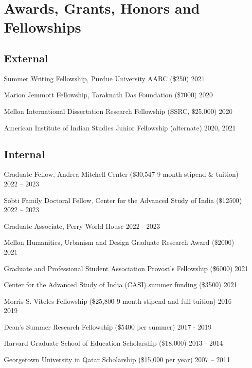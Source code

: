 \documentclass[11pt,letterpaper]{report}
\newcommand{\listitemspace}{0.25em}
\renewenvironment{itemize}{\begin{list}{}{\setlength{\leftmargin}{0em}\setlength{\parskip}{0em}\setlength{\itemsep}{\listitemspace}\setlength{\parsep}{\listitemspace}}}{\end{list}}
\begin{document}
    \section*{Awards, Grants, Honors and Fellowships}
    \subsection*{External}
    \begin{itemize}
        \item Summer Writing Fellowship, Purdue University AARC (\$250) 2021
        \item Marion Jemmott Fellowship, Taraknath Das Foundation (\$7000) 2020
        \item Mellon International Dissertation Research Fellowship (SSRC, \$25,000) 2020
        \item American Institute of Indian Studies Junior Fellowship (alternate) 2020, 2021
    \end{itemize}
    \subsection*{Internal}
    \begin{itemize}
        \item Graduate Fellow, Andrea Mitchell Center (\$30,547 9-month stipend \& tuition) 2022 – 2023
        \item Sobti Family Doctoral Fellow, Center for the Advanced Study of India (\$12500) 2022 – 2023
        \item Graduate Associate, Perry World House 2022 - 2023
        \item Mellon Humanities, Urbanism and Design Graduate Research Award (\$2000) 2021
        \item Graduate and Professional Student Association Provost’s Fellowship (\$6000) 2021
        \item Center for the Advanced Study of India (CASI) summer funding (\$3500) 2021
        \item Morris S. Viteles Fellowship (\$25,800 9-month stipend and full tuition) 2016 – 2019
        \item Dean’s Summer Research Fellowship (\$5400 per summer) 2017 - 2019
        \item Harvard Graduate School of Education Scholarship (\$18,000) 2013 - 2014
        \item Georgetown University in Qatar Scholarship (\$15,000 per year) 2007 – 2011
    \end{itemize}
\end{document}
